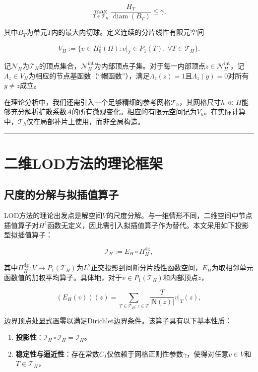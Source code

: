 \documentclass[
]{article}
\providecommand{\tightlist}{%
  \setlength{\itemsep}{0pt}\setlength{\parskip}{0pt}}
\begin{document}
\[
\max_{T \in \mathcal{T}_H} \frac{H_T}{\operatorname{diam}(B_T)} \leq \gamma,
\]

其中\(B_T\)为单元\(T\)内的最大内切球。定义连续的分片线性有限元空间

\[
V_H := \{v \in H_0^1(\Omega) : v|_T \in P_1(T), \ \forall T \in \mathcal{T}_H\}.
\]

记\(\mathcal{N}_H\)为\(\mathcal{T}_H\)的顶点集合，\(\mathcal{N}_H^{\mathrm{int}}\)为内部顶点子集。对于每一内部顶点\(z \in \mathcal{N}_H^{\mathrm{int}}\)，记\(\Lambda_z \in V_H\)为相应的节点基函数（``帽函数''），满足\(\Lambda_z(z) = 1\)且\(\Lambda_z(y) = 0\)对所有\(y \neq z\)成立。

在理论分析中，我们还需引入一个足够精细的参考网格\(\mathcal{T}_h\)，其网格尺寸\(h \ll H\)能够充分解析扩散系数\(A\)的所有微观变化。相应的有限元空间记为\(V_h\)。在实际计算中，\(\mathcal{T}_h\)仅在局部补片上使用，而非全局构造。

\begin{center}\rule{0.5\linewidth}{0.5pt}\end{center}

\section{二维LOD方法的理论框架}\label{chap-3}

\subsection{尺度的分解与拟插值算子}\label{chap-3-1}

LOD方法的理论出发点是解空间\(V\)的尺度分解。与一维情形不同，二维空间中节点插值算子对\(H^1\)函数无定义，因此需引入拟插值算子作为替代。本文采用如下投影型拟插值算子：

\[
\mathcal{I}_H := E_H \circ \Pi_H^{\mathrm{dg}},
\]

其中\(\Pi_H^{\mathrm{dg}}: V \to P_1(\mathcal{T}_H)\)为\(L^2\)正交投影到间断分片线性函数空间，\(E_H\)为取相邻单元函数值的加权平均算子。具体地，对于\(v \in P_1(\mathcal{T}_H)\)和内部顶点\(z\)，

\[
(E_H(v))(z) = \sum_{T \in \mathcal{T}_H: z \in T} \frac{|T|}{|\mathsf{N}(z)|} v|_T(z),
\]

边界顶点处显式置零以满足Dirichlet边界条件。该算子具有以下基本性质：

\begin{enumerate}
\def\labelenumi{\arabic{enumi}.}
\tightlist
\item
  \textbf{投影性}：\(\mathcal{I}_H \circ \mathcal{I}_H = \mathcal{I}_H\)。
\item
  \textbf{稳定性与逼近性}：存在常数\(C_I\)仅依赖于网格正则性参数\(\gamma\)，使得对任意\(v \in V\)和\(T \in \mathcal{T}_H\)，
\end{enumerate}
\end{document}
